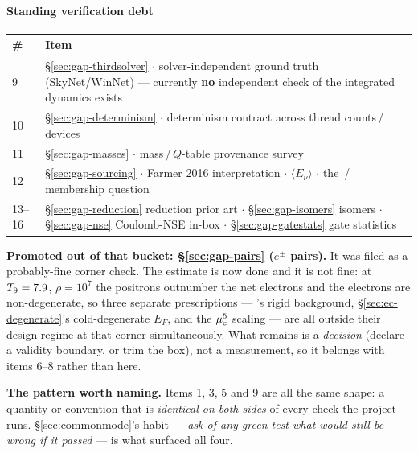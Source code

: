 \paragraph{Standing verification debt}

\begin{center}
\begin{tabularx}{\textwidth}{@{}L{1.2cm} Y@{}}
\toprule
\textbf{\#} & \textbf{Item} \\
 & \S\ref{sec:gap-thirdsolver} $\cdot$ solver-independent ground truth
  (SkyNet/WinNet) --- currently \textbf{no} independent check of the integrated
  dynamics exists \\
10 & \S\ref{sec:gap-determinism} $\cdot$ determinism contract across thread
  counts\,/\,devices \\
11 & \S\ref{sec:gap-masses} $\cdot$ mass\,/\,$Q$-table provenance survey \\
12 & \S\ref{sec:gap-sourcing} $\cdot$ Farmer 2016 interpretation $\cdot$
  $\langle E_\nu\rangle$ $\cdot$ the \,/\, membership
  question \\
13--16 & \S\ref{sec:gap-reduction} reduction prior art $\cdot$
  \S\ref{sec:gap-isomers} isomers $\cdot$ \S\ref{sec:gap-nse} Coulomb-NSE
  in-box $\cdot$ \S\ref{sec:gap-gatestats} gate statistics \\
\bottomrule
\end{tabularx}
\end{center}

\textbf{Promoted out of that bucket: \S\ref{sec:gap-pairs} ($e^\pm$ pairs).} It
was filed as a probably-fine corner check. The estimate is now done and it is
not fine: at $T_{9} = 7.9$, $\rho = 10^7$ the positrons outnumber the net
electrons and the electrons are non-degenerate, so three separate prescriptions
--- 's rigid background, \S\ref{sec:ec-degenerate}'s
cold-degenerate $E_F$, and the $\mu_{e}^5$ scaling --- are all outside their design
regime at that corner simultaneously. What remains is a \emph{decision} (declare
a validity boundary, or trim the box), not a measurement, so it belongs with
items 6--8 rather than here.

\textbf{The pattern worth naming.} Items 1, 3, 5 and 9 are all the same shape: a
quantity or convention that is \emph{identical on both sides} of every check the
project runs. \S\ref{sec:commonmode}'s habit --- \emph{ask of any green test what
would still be wrong if it passed} --- is what surfaced all four.
